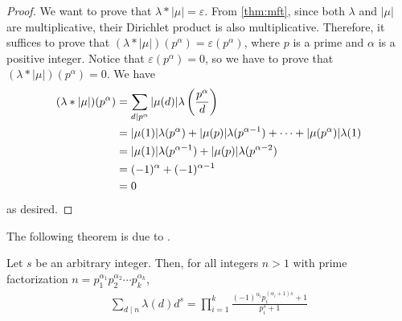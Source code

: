 	\begin{proof}
		We want to prove that $\lambda\ast |\mu| = \varepsilon$. From \autoref{thm:mft}, since both $\lambda$ and $|\mu|$ are multiplicative, their Dirichlet product is also multiplicative. Therefore, it suffices to prove that $(\lambda\ast |\mu|)(p^\alpha)=\varepsilon(p^\alpha )$, where $p$ is a prime and $\alpha$ is a positive integer. Notice that $\varepsilon(p^\alpha ) = 0$, so we have to prove that $(\lambda\ast |\mu|)(p^\alpha)=0$. We have
			\begin{align*}
				(\lambda\ast |\mu|)(p^\alpha)
					&= \sum_{d\mid p^\alpha} |\mu(d)| \lambda\left(\frac{p^\alpha}{d}\right)\\
					&= |\mu(1)|\lambda(p^{\alpha}) + |\mu(p)|\lambda(p^{\alpha -1}) + \cdots + |\mu(p^{\alpha})| \lambda(1)\\
					&= |\mu(1)|\lambda(p^{\alpha-1}) + |\mu(p)|\lambda(p^{\alpha -2})\\
					&= (-1)^{\alpha} + (-1)^{\alpha -1}\\
					&= 0
			\end{align*}
		as desired.
	\end{proof}
The following theorem is due to \textcite[Chapter $\S$IV, Section $11$, Page $196-197$]{sierpinski_schinzel_1988}.
	\begin{theorem}\label{thm:liouville-sum-general}
		Let $s$ be an arbitrary integer. Then, for all integers $n >1$ with prime factorization $n= p_1^{\alpha_1} p_2^{\alpha_2} \cdots p_k^{\alpha_k}$,
			\begin{align*}
				\sum_{d\mid n} \lambda(d) d^s = \prod_{i=1}^{k} \frac{(-1)^{\alpha_i} p_i^{(\alpha_i+1)s} + 1}{p_i^s + 1}
			\end{align*}
	\end{theorem}

